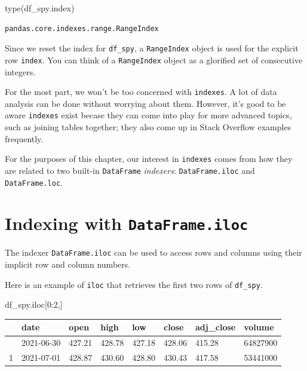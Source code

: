 \documentclass[
  letterpaper,
  DIV=11,
  numbers=noendperiod]{scrreprt}
\newenvironment{Shaded}{\begin{snugshade}}{\end{snugshade}}
\newcommand{\BuiltInTok}[1]{\textcolor[rgb]{0.00,0.23,0.31}{#1}}
\newcommand{\DecValTok}[1]{\textcolor[rgb]{0.68,0.00,0.00}{#1}}
\newcommand{\NormalTok}[1]{\textcolor[rgb]{0.00,0.23,0.31}{#1}}
\begin{document}
\begin{Shaded}
\begin{Highlighting}[]
\BuiltInTok{type}\NormalTok{(df\_spy.index)}
\end{Highlighting}
\end{Shaded}

\begin{verbatim}
pandas.core.indexes.range.RangeIndex
\end{verbatim}

Since we reset the index for \texttt{df\_spy}, a \texttt{RangeIndex}
object is used for the explicit row \texttt{index}. You can think of a
\texttt{RangeIndex} object as a glorified set of consecutive integers.

For the most part, we won't be too concerned with \texttt{indexes}. A
lot of data analysis can be done without worrying about them. However,
it's good to be aware \texttt{indexes} exist becase they can come into
play for more advanced topics, such as joining tables together; they
also come up in Stack Overflow examples frequently.

For the purposes of this chapter, our interest in \texttt{indexes} comes
from how they are related to two built-in \texttt{DataFrame}
\emph{indexers}: \texttt{DataFrame.iloc} and \texttt{DataFrame.loc}.

\hypertarget{indexing-with-dataframe.iloc}{%
\section{\texorpdfstring{Indexing with
\texttt{DataFrame.iloc}}{Indexing with DataFrame.iloc}}\label{indexing-with-dataframe.iloc}}

The indexer \texttt{DataFrame.iloc} can be used to access rows and
columns using their implicit row and column numbers.

Here is an example of \texttt{iloc} that retrieves the first two rows of
\texttt{df\_spy}.

\begin{Shaded}
\begin{Highlighting}[]
\NormalTok{df\_spy.iloc[}\DecValTok{0}\NormalTok{:}\DecValTok{2}\NormalTok{,]}
\end{Highlighting}
\end{Shaded}

\begin{longtable}[]{@{}llllllll@{}}
\toprule\noalign{}
& date & open & high & low & close & adj\_close & volume \\
\midrule\noalign{}
\endhead
\bottomrule\noalign{}
\endlastfoot
0 & 2021-06-30 & 427.21 & 428.78 & 427.18 & 428.06 & 415.28 &
64827900 \\
1 & 2021-07-01 & 428.87 & 430.60 & 428.80 & 430.43 & 417.58 &
53441000 \\
\end{longtable}
\end{document}

